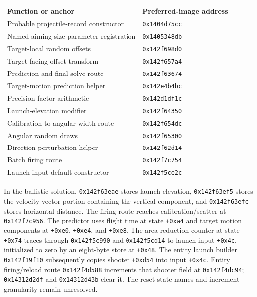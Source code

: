 \documentclass[11pt]{article}
\begin{document}
\begin{center}
\begin{tabular}{ll}
\toprule
Function or anchor & Preferred-image address\\
\midrule
Probable projectile-record constructor & \texttt{0x1404d75cc}\\
Named aiming-size parameter registration & \texttt{0x1405348db}\\
Target-local random offsets & \texttt{0x142f698d0}\\
Target-facing offset transform & \texttt{0x142f657a4}\\
Prediction and final-solve route & \texttt{0x142f63674}\\
Target-motion prediction helper & \texttt{0x142e4b4bc}\\
Precision-factor arithmetic & \texttt{0x142d1df1c}\\
Launch-elevation modifier & \texttt{0x142f64350}\\
Calibration-to-angular-width route & \texttt{0x142f654dc}\\
Angular random draws & \texttt{0x142f65300}\\
Direction perturbation helper & \texttt{0x142f62d14}\\
Batch firing route & \texttt{0x142f7c754}\\
Launch-input default constructor & \texttt{0x142f5ce2c}\\
\bottomrule
\end{tabular}
\end{center}

In the ballistic solution, \texttt{0x142f63eae} stores launch elevation,
\texttt{0x142f63ef5} stores the velocity-vector portion containing the vertical
component, and \texttt{0x142f63efc} stores horizontal distance.
The firing route reaches calibration/scatter at \texttt{0x142f7c956}.
The predictor uses flight time at state \texttt{+0xa4} and target motion
components at \texttt{+0xe0}, \texttt{+0xe4}, and \texttt{+0xe8}.
The area-reduction counter at state \texttt{+0x74} traces through
\texttt{0x142f5c990} and \texttt{0x142f5cd14} to launch-input \texttt{+0x4c},
initialized to zero by an eight-byte store at \texttt{+0x48}.
The entity launch builder \texttt{0x142f19f10} subsequently copies shooter
\texttt{+0xd54} into input \texttt{+0x4c}.  Entity firing/reload route
\texttt{0x142f4d588} increments that shooter field at \texttt{0x142f4dc94};
\texttt{0x14312d2df} and \texttt{0x14312d43b} clear it.  The reset-state names
and increment granularity remain unresolved.
\end{document}
